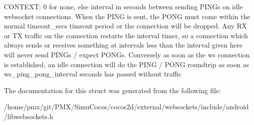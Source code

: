 C\+O\+N\+T\+E\+XT\+: 0 for none, else interval in seconds between sending P\+I\+N\+Gs on idle websocket connections. When the P\+I\+NG is sent, the P\+O\+NG must come within the normal timeout\+\_\+secs timeout period or the connection will be dropped. Any RX or TX traffic on the connection restarts the interval timer, so a connection which always sends or receives something at intervals less than the interval given here will never send P\+I\+N\+Gs / expect P\+O\+N\+Gs. Conversely as soon as the ws connection is established, an idle connection will do the P\+I\+NG / P\+O\+NG roundtrip as soon as ws\+\_\+ping\+\_\+pong\+\_\+interval seconds has passed without traffic 

The documentation for this struct was generated from the following file\+:\begin{DoxyCompactItemize}
\item 
/home/pmx/git/\+P\+M\+X/\+Simu\+Cocos/cocos2d/external/websockets/include/android/libwebsockets.\+h\end{DoxyCompactItemize}
